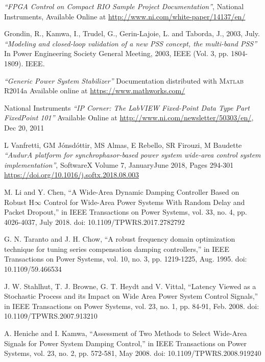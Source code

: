 \documentclass{ieeeaccess}
\begin{document}
\begin{thebibliography}{00}
 \emph{``FPGA Control on Compact RIO Sample Project Documentation''}, National Instruments, Available Online at \underline{http://www.ni.com/white-paper/14137/en/}


 Grondin, R., Kamwa, I., Trudel, G., Gerin-Lajoie, L. and Taborda, J., 2003, July. \emph{``Modeling and closed-loop validation of a new PSS concept, the multi-band PSS''} In Power Engineering Society General Meeting, 2003, IEEE (Vol. 3, pp. 1804-1809). IEEE.

 \emph{``Generic Power System Stabilizer''} Documentation distributed with \textsc{Matlab} R2014a Available online at \underline{https://www.mathworks.com/}

National Instruments \emph{``IP Corner: The LabVIEW Fixed-Point Data Type Part Fixed\textendash Point 101''} Available Online at \underline{http://www.ni.com/newsletter/50303/en/}, Dec 20, 2011 

 L Vanfretti, GM J\'{o}nsd\'{o}ttir, MS Almas, E Rebello, SR Firouzi, M Baudette \emph{``Audur\textendash A platform for synchrophasor-based power system wide-area control system implementation''}, SoftwareX Volume 7, January\textendash June 2018, Pages 294-301 \underline{https://doi.org/10.1016/j.softx.2018.08.003}

 M. Li and Y. Chen, ``A Wide-Area Dynamic Damping Controller Based on Robust H$\infty$ Control for Wide-Area Power Systems With Random Delay and Packet Dropout,'' in IEEE Transactions on Power Systems, vol. 33, no. 4, pp. 4026-4037, July 2018. doi: 10.1109/TPWRS.2017.2782792

 G. N. Taranto and J. H. Chow, ``A robust frequency domain optimization technique for tuning series compensation damping controllers,'' in IEEE Transactions on Power Systems, vol. 10, no. 3, pp. 1219-1225, Aug. 1995.
doi: 10.1109/59.466534

 J. W. Stahlhut, T. J. Browne, G. T. Heydt and V. Vittal, ``Latency Viewed as a Stochastic Process and its Impact on Wide Area Power System Control Signals,''  in IEEE Transactions on Power Systems, vol. 23, no. 1, pp. 84-91, Feb. 2008. doi: 10.1109/TPWRS.2007.913210

 A. Heniche and I. Kamwa, ``Assessment of Two Methods to Select Wide-Area Signals for Power System Damping Control,'' in IEEE Transactions on Power Systems, vol. 23, no. 2, pp. 572-581, May 2008. doi: 10.1109/TPWRS.2008.919240


\end{thebibliography}
\end{document}
